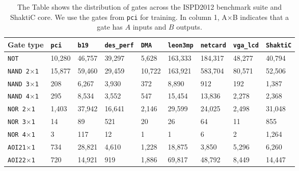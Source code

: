  \begin{table}[!ht]
     \caption{The Table shows the distribution of gates across the ISPD2012 benchmark suite and ShaktiC core. We use the gates from \texttt{pci} for training. In column 1, A$\times$B indicates that a gate has $A$ inputs and $B$ outputs.}
\label{tab:tab2}

     \begin{tabular}{|p{2cm}|p{1cm}|p{1.2cm}|p{1.8cm}|p{1cm}|p{1.6cm}|p{1.4cm}|p{1.4cm}|p{1.4cm}|}
\hline
         \textbf{Gate type}   &\texttt{pci}&\texttt{b19}&\texttt{des\_perf}&\texttt{DMA}&\texttt{leon3mp}&\texttt{netcard}&\texttt{vga\_lcd} & \texttt{ShaktiC}\\ \hline
    \texttt{NOT     }& 10,280                & 46,757        & 39,297              & 5,628         & 163,333           & 184,317           & 48,277     & 40,794        \\ \hline
    \texttt{NAND 2$\times$1}& 15,877                & 59,460        & 29,459              & 10,722        & 163,921           & 583,704           & 80,571 & 52,506            \\ \hline
    \texttt{NAND 3$\times$1}& 208                  & 6,267         & 3,930               & 372          & 8,890             & 912              & 192   & 1,387           \\ \hline
    \texttt{NAND 4$\times$1}& 295                  & 8,534         & 3,552               & 547          & 15,454            & 13,836            & 2,278 & 2,368            \\ \hline
    \texttt{NOR 2$\times$1}  & 1,403                 & 37,942        & 16,641              & 2,146         & 29,599            & 24,025            & 2,498   & 31,048           \\ \hline
    \texttt{NOR 3$\times$1}  & 14                   & 89           & 521                & 20           & 26               & 64               & 11          & 855     \\ \hline
    \texttt{NOR 4$\times$1}  & 3                    & 117          & 12                 & 1            & 1                & 6                & 2            & 1,264     \\ \hline
    \texttt{AOI21$\times$1}     & 734                  & 28,821        & 4,610               & 1,228         & 18,875            & 3,850             & 5,296   & 6,260           \\ \hline
    \texttt{AOI22$\times$1}     & 720                  & 14,921        & 919                & 1,886         & 69,817            & 48,792            & 8,449   & 14,447           \\ \hline

\end{tabular}
\end{table}
